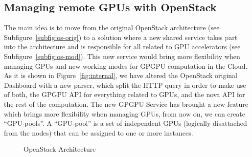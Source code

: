 \documentclass[a4paper,twoside]{article}
\begin{document}
\subsection{Managing remote GPUs with OpenStack}
The main idea is to move from the original OpenStack architecture (see Subfigure~\ref{subfig:os-orig}) to a solution where a new shared service takes part into the architecture and is responsible for all related to GPU accelerators (see Subfigure~\ref{subfig:os-mod}).
This new service would bring more flexibility when managing GPUs and new working modes for GPGPU computation in the Cloud.
As it is shown in Figure~\ref{fig:internal}, we have altered the OpenStack original Dashboard with a new parser, 
which split the HTTP query in order to make use of both, the GPGPU API for everything related to GPUs, and the nova API for the rest of the computation. 
The new GPGPU Service has brought a new feature which brings more flexibility when managing GPUs, from now on, we can create ``GPU-pools''. 
A ``GPU-pool'' is a set of independent GPUs (logically disattached from the nodes) that can be assigned to one or more instances.

\begin{figure}[htb]
  \centering
   \quad
  \caption{OpenStack Architecture}
  \label{fig:os}
\end{figure}
\end{document}

